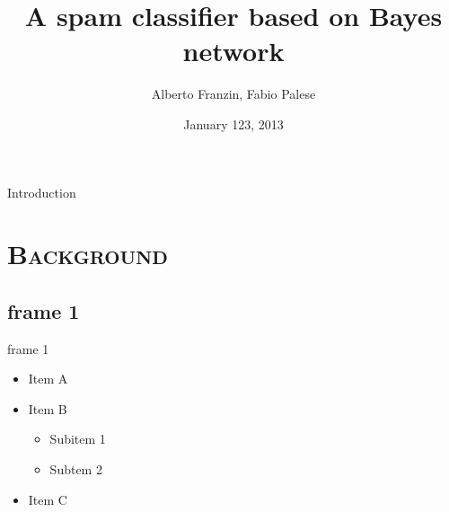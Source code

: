 \documentclass[xcolor=x11names,compress]{beamer}
\title{A spam classifier based on Bayes network}
\author{Alberto Franzin, Fabio Palese}
\date{January 123, 2013}
\institute[2013]{Sistemi Intelligenti}
\renewcommand{\(}{\begin{columns}}
\renewcommand{\)}{\end{columns}}
\newcommand{\<}[1]{\begin{column}{#1}}
\renewcommand{\>}{\end{column}}
\begin{document}

\frame{\titlepage}


\begin{frame}{Introduction}
\tableofcontents
\end{frame}

\section{\scshape Background}
\subsection{frame 1}
\begin{frame}{frame 1}
\begin{itemize}
\item Item A
\item Item B
\begin{itemize}
\item Subitem 1
\item Subtem 2
\end{itemize}
\item Item C
\end{itemize}
\end{frame}
\end{document}

